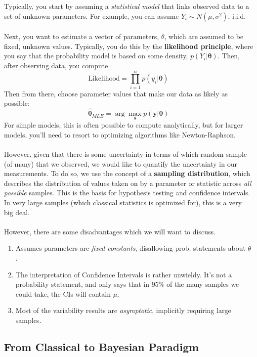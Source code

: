\documentclass[a4paper,12pt]{scrartcl}
\begin{document}
Typically, you start by assuming a \emph{statistical model} that links
observed data to a set of unknown parameters.  For example, you
can assume $Y_i \sim N(\mu,\sigma^2)$, i.i.d.
\\
\\
Next, you want to estimate a vector of parameters, $\mathbb{\theta}$,
which are assumed to be fixed, unknown values. Typically, you do this
by the \textbf{likelihood principle}, where you say that the probability
model is based on some density, $p(Y_i | \mathbf{\theta})$. Then, after
observing data, you compute
   \[ \text{Likelihood} = \prod^n_{i=1} p(y_i | \mathbf{\theta}) \]
Then from there, choose parameter values that make our data as 
likely as possible:
   \[ \hat{\mathbf{\theta}}_{MLE} = \arg \max_{\mathbb{\theta}} 
      p( \mathbf{y} | \mathbf{\theta}) \]
For simple models, this is often possible to compute analytically, but
for larger models, you'll need to resort to optimizing algorithms
like Newton-Raphson.
\\
\\
However, given that there is some uncertainty in terms of which
random sample (of many) that we observed, we would like to quantify
the uncertainty in our measurements.  To do so, we use the concept
of a \textbf{sampling distribution}, which describes the distribution
of values taken on by a parameter or statistic across \emph{all
possible} samples.  This is the basis for hypothesis testing and
confidence intervals.  In very large samples (which classical 
statistics is optimized for), this is a very big deal.
\\
\\
However, there are some disadvantages which we will want to discuss.
\begin{enumerate}
   \item{Assumes parameters are \emph{fixed constants}, 
      disallowing prob. statements about $\theta$.}
   \item{The interpretation of Confidence Intervals is rather unwieldy.
      It's not a probability statement, and only says that in 95\%
      of the many samples we could take, the CIs will contain $\mu$.}
   \item{Most of the variability results are \emph{asymptotic}, 
      implicitly requiring large samples.}
\end{enumerate}
   
\subsection{From Classical to Bayesian Paradigm}
\end{document}
